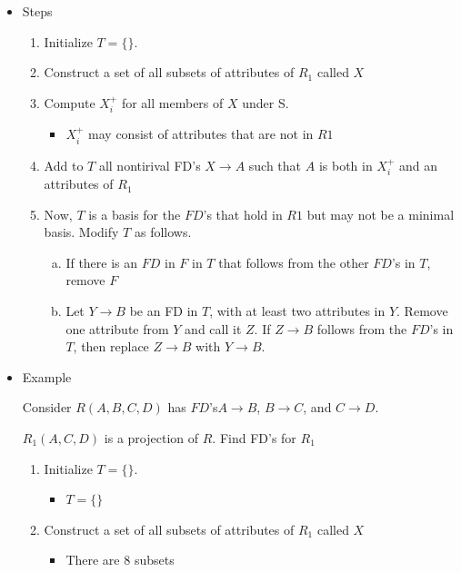 \documentclass[12pt]{article}
\begin{document}
\begin{enumerate}[1.]
\begin{enumerate}[a)]
\begin{itemize}
\begin{itemize}
                \item Steps
                \begin{enumerate}[1.]
                    \item Initialize $T = \{\}$.
                    \item Construct a set of all subsets of attributes of $R_1$ called $X$
                    \item Compute $X_i^+$ for all members of $X$ under S.
                    \begin{itemize}
                        \item $X_i^+$ may consist of attributes that are not in $R1$
                    \end{itemize}
                    \item Add to $T$ all nontirival FD's $X \to A$ such that $A$
                    is both in $X_i^+$ and an attributes of $R_1$
                    \item Now, $T$ is a basis for the $FD$'s that hold in $R1$ but
                    may not be a minimal basis. Modify $T$ as follows.

                    \begin{enumerate}[a)]
                        \item If there is an $FD$ in $F$ in $T$ that follows from
                        the other $FD$'s in $T$, remove $F$
                        \item Let $Y \to B$ be an FD in $T$, with at least two
                        attributes in $Y$. Remove one attribute from $Y$ and call
                        it $Z$. If $Z \to B$ follows from the $FD$'s in $T$, then
                        replace $Z \to B$ with $Y \to B$.
                    \end{enumerate}
                \end{enumerate}
                \item Example

                \bigskip

                Consider $R(A,B,C,D)$ has $FD$'s$A \to B$, $B \to C$, and $C \to D$.

                $R_1(A,C,D)$ is a projection of $R$. Find FD's for $R_1$

                \begin{enumerate}[1.]
                    \item Initialize $T = \{\}$.
                    \color{red}
                    \begin{itemize}
                        \item $T = \{\}$
                    \end{itemize}
                    \color{black}
                    \item Construct a set of all subsets of attributes of $R_1$ called $X$
                    \color{red}
                    \begin{itemize}
                        \item There are 8 subsets


\end{itemize}
\end{enumerate}
\end{itemize}
\end{itemize}
\end{enumerate}
\end{enumerate}
\end{document}
